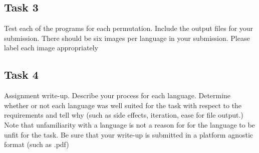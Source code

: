 \documentclass[a4paper]{article}
\begin{document}
\subsection*{Task 3}
Test each of the programs for each permutation. Include the output files for your submission. There should be six images per language in your submission. Please label each image appropriately

\subsection*{Task 4}
Assignment write-up. Describe your process for each language. Determine whether or not each language was well suited for the task with respect to the requirements and tell why (such as side effects, iteration, ease for file output.) Note that unfamiliarity with a language is not a reason for for the language to be unfit for the task. Be sure that your write-up is submitted in a platform agnostic format (such as .pdf)





\end{document}

